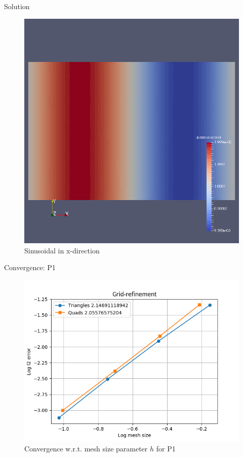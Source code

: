 \documentclass[11pt]{beamer}
\begin{document}
\begin{frame}{Solution}
\begin{figure}
	\centering
	\includegraphics[scale=0.25]{solution-steady-linadv}
	\caption{Sinusoidal in x-direction}
\end{figure}
\end{frame}
\begin{frame}{Convergence: P1}
\begin{figure}
	\centering
	\includegraphics[scale=0.5]{linadv-taylor-p1}
	\caption{Convergence w.r.t. mesh size parameter $h$ for P1}
\end{figure}
\end{frame}
\end{document}
